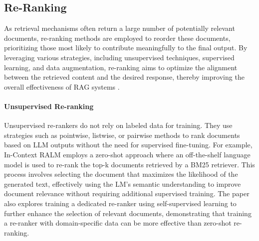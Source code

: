 \subsection{Re-Ranking}
As retrieval mechanisms often return a large number of potentially relevant documents, re-ranking methods are employed to reorder these documents, prioritizing those most likely to contribute meaningfully to the final output. By leveraging various strategies, including unsupervised techniques, supervised learning, and data augmentation, re-ranking aims to optimize the alignment between the retrieved content and the desired response, thereby improving the overall effectiveness of RAG systems \cite{zhu2023large}.

\paragraph{Unsupervised Re-ranking} Unsupervised re-rankers do not rely on labeled data for training. They use strategies such as pointwise, listwise, or pairwise methods to rank documents based on LLM outputs without the need for supervised fine-tuning. For example, In-Context RALM \cite{ram2023incontext} employs a zero-shot approach where an off-the-shelf language model is used to re-rank the top-k documents retrieved by a BM25 retriever. This process involves selecting the document that maximizes the likelihood of the generated text, effectively using the LM's semantic understanding to improve document relevance without requiring additional supervised training. The paper also explores training a dedicated re-ranker using self-supervised learning to further enhance the selection of relevant documents, demonstrating that training a re-ranker with domain-specific data can be more effective than zero-shot re-ranking.

